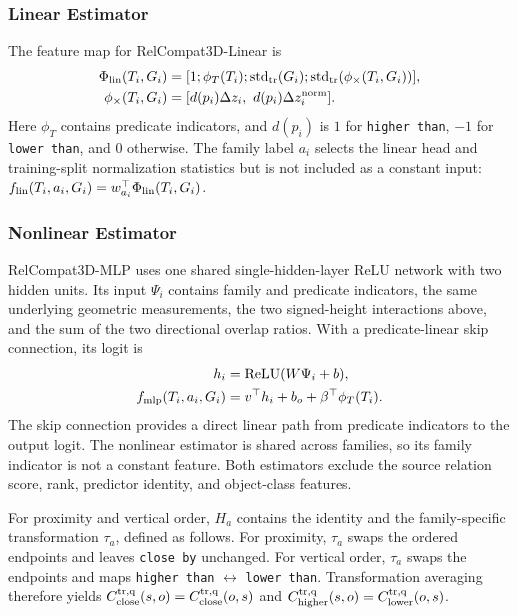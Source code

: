 \subsubsection{Linear Estimator}
The feature map for RelCompat3D-Linear is 
\begin{equation}
\begin{aligned}
\Phi_{\rm lin}(T_i,G_i)&=[1;\phi_T(T_i);\operatorname{std}_{\rm tr}(G_i);
\operatorname{std}_{\rm tr}(\phi_{\times}(T_i,G_i))],\\
\phi_{\times}(T_i,G_i)&=
[d(p_i)\Delta z_i,\ d(p_i)\Delta z_i^{\rm norm}].
\end{aligned}
\end{equation}
Here $\phi_T$ contains predicate indicators, and $d(p_i)$ is $1$ for \texttt{higher than}, $-1$ for \texttt{lower than}, and $0$ otherwise. The family label $a_i$ selects the linear head and training-split normalization statistics but is not included as a constant input: $f_{\rm lin}(T_i,a_i,G_i)=w_{a_i}^\top\Phi_{\rm lin}(T_i,G_i)$.

\subsubsection{Nonlinear Estimator}
RelCompat3D-MLP uses one shared single-hidden-layer ReLU network with two hidden units. Its input $\Psi_i$ contains family and predicate indicators, the same underlying geometric measurements, the two signed-height interactions above, and the sum of the two directional overlap ratios. With a predicate-linear skip connection, its logit is
\begin{equation}
\begin{aligned}
h_i&=\operatorname{ReLU}(W\Psi_i+b),\\
f_{\rm mlp}(T_i,a_i,G_i)&=v^\top h_i+b_o+
\beta^\top\phi_T(T_i).
\end{aligned}
\end{equation}
The skip connection provides a direct linear path from predicate indicators to the output logit. The nonlinear estimator is shared across families, so its family indicator is not a constant feature. Both estimators exclude the source relation score, rank, predictor identity, and object-class features.

For proximity and vertical order, $H_a$ contains the identity and the family-specific transformation $\tau_a$, defined as follows. For proximity, $\tau_a$ swaps the ordered endpoints and leaves \texttt{close by} unchanged. For vertical order, $\tau_a$ swaps the endpoints and maps \texttt{higher than} $\leftrightarrow$ \texttt{lower than}. Transformation averaging therefore yields 
$C^{\rm tr,q}_{\rm close}(s,o)=C^{\rm tr,q}_{\rm close}(o,s)$ and
$C^{\rm tr,q}_{\rm higher}(s,o)=C^{\rm tr,q}_{\rm lower}(o,s)$.

